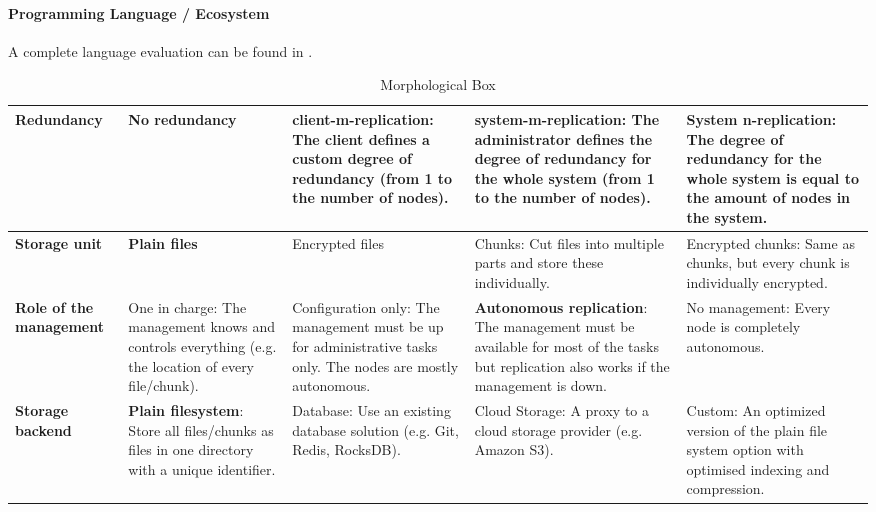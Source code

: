 \paragraph{Programming Language / Ecosystem}
A complete language evaluation can be found in .

\begin{table}
	\centering
	\caption[Morphological Box]{Morphological Box}
	\label{tbl:morphological-box}
    \begin{tabu}{X | X X X X}
		\hline
          \textbf{Redundancy}
          & No redundancy
          & \Gls{client-m-replication}: The \gls{client} defines a custom degree of redundancy (from 1 to the number of \glspl{node}).
          & \Gls{system-m-replication}: The administrator defines the degree of redundancy for the whole system (from 1 to the number of \glspl{node}).
          & \textbf{System n-replication}: The degree of redundancy for the whole system is equal to the amount of \glspl{node} in the system.
          \\ \hline

          \textbf{Storage unit}
          & \textbf{Plain files}
          & Encrypted files
          & Chunks: Cut files into multiple parts and store these individually.
          & Encrypted chunks: Same as chunks, but every chunk is individually encrypted.
          \\ \hline


          \textbf{Role of the management}
          & One in charge: The management knows and controls everything (e.g. the location of every file/chunk).
          & Configuration only: The management must be up for administrative tasks only. The \glspl{node} are mostly autonomous.
          & \textbf{Autonomous replication}: The management must be available for most of the tasks but replication also works if the management is down.
          & No management: Every \gls{node} is completely autonomous.
          \\ \hline


          \textbf{Storage backend}
          & \textbf{Plain filesystem}: Store all files/chunks as files in one directory with a unique identifier.
          & Database: Use an existing database solution (e.g. Git, Redis, RocksDB).
          & Cloud Storage: A proxy to a cloud storage provider (e.g. Amazon S3).
          & Custom: An optimized version of the plain file system option with optimised indexing and compression.
          \\ \hline



\end{tabu}
\end{table}
